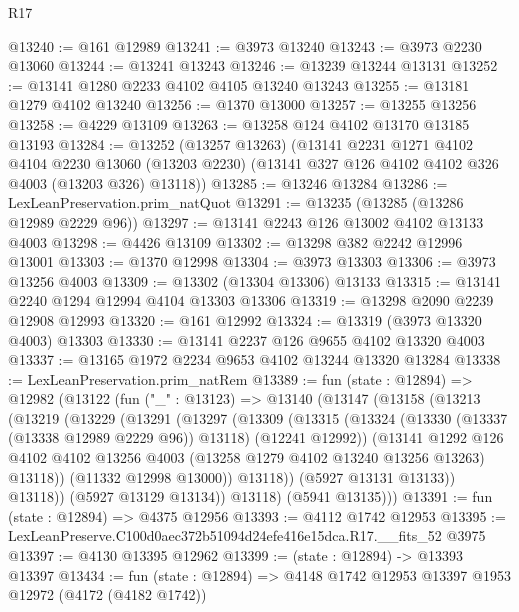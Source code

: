 \begin{lexlean}{R17}
\begin{coremodule}
@13240 := @161 @12989
@13241 := @3973 @13240
@13243 := @3973 @2230 @13060
@13244 := @13241 @13243
@13246 := @13239 @13244 @13131
@13252 := @13141 @1280 @2233 @4102 @4105 @13240 @13243
@13255 := @13181 @1279 @4102 @13240
@13256 := @1370 @13000
@13257 := @13255 @13256
@13258 := @4229 @13109
@13263 := @13258 @124 @4102 @13170 @13185 @13193
@13284 := @13252
    (@13257 @13263)
    (@13141
      @2231
      @1271
      @4102
      @4104
      @2230
      @13060
      (@13203 @2230)
      (@13141 @327 @126 @4102 @4102 @326 @4003 (@13203 @326) @13118))
@13285 := @13246 @13284
@13286 := LexLeanPreservation.prim_natQuot
@13291 := @13235 (@13285 (@13286 @12989 @2229 @96))
@13297 := @13141 @2243 @126 @13002 @4102 @13133 @4003
@13298 := @4426 @13109
@13302 := @13298 @382 @2242 @12996 @13001
@13303 := @1370 @12998
@13304 := @3973 @13303
@13306 := @3973 @13256 @4003
@13309 := @13302 (@13304 @13306) @13133
@13315 := @13141 @2240 @1294 @12994 @4104 @13303 @13306
@13319 := @13298 @2090 @2239 @12908 @12993
@13320 := @161 @12992
@13324 := @13319 (@3973 @13320 @4003) @13303
@13330 := @13141 @2237 @126 @9655 @4102 @13320 @4003
@13337 := @13165 @1972 @2234 @9653 @4102 @13244 @13320 @13284
@13338 := LexLeanPreservation.prim_natRem
@13389 := fun (state : @12894) =>
  @12982
    (@13122
      (fun ("_" : @13123) =>
      @13140
        (@13147
          (@13158
            (@13213
              (@13219
                (@13229
                  (@13291
                    (@13297
                      (@13309
                        (@13315
                          (@13324
                            (@13330 (@13337 (@13338 @12989 @2229 @96)) @13118)
                            (@12241 @12992))
                          (@13141
                            @1292
                            @126
                            @4102
                            @4102
                            @13256
                            @4003
                            (@13258 @1279 @4102 @13240 @13256 @13263)
                            @13118))
                        (@11332 @12998 @13000))
                      @13118))
                  (@5927 @13131 @13133))
                @13118))
            (@5927 @13129 @13134))
          @13118)
        (@5941 @13135)))
@13391 := fun (state : @12894) => @4375 @12956
@13393 := @4112 @1742 @12953
@13395 := LexLeanPreserve.C100d0aec372b51094d24efe416e15dca.R17.__fits_52 @3975
@13397 := @4130 @13395 @12962
@13399 := (state : @12894) -> @13393 @13397
@13434 := fun (state : @12894) =>
  @4148
    @1742
    @12953
    @13397
    @1953
    @12972
    (@4172 (@4182 @1742))

\end{coremodule}
\end{lexlean}
